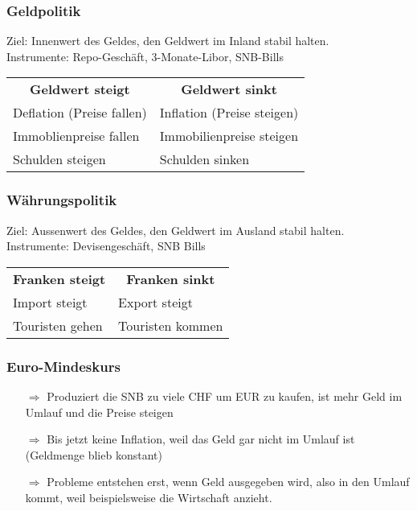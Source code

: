 \subsubsection{Geldpolitik}
Ziel: Innenwert des Geldes, den Geldwert im Inland stabil halten. \\
Instrumente: Repo-Geschäft, 3-Monate-Libor, SNB-Bills\\

\begin{center}
	\begin{tabular}{ll}
		\multicolumn{1}{c}{\textbf{Geldwert steigt}} & \multicolumn{1}{c}{\textbf{Geldwert sinkt}}\\
		Deflation (Preise fallen)	& Inflation (Preise steigen)\\
		Immoblienpreise fallen		& Immobilienpreise steigen\\
		Schulden steigen			& Schulden sinken\\
	\end{tabular}
\end{center}


\subsubsection{Währungspolitik}
Ziel: Aussenwert des Geldes, den Geldwert im Ausland stabil halten.\\
Instrumente: Devisengeschäft, SNB Bills\\

\begin{center}
	\begin{tabular}{ll}
		\multicolumn{1}{c}{\textbf{Franken steigt}} & \multicolumn{1}{c}{\textbf{Franken sinkt}}\\
		Import steigt				& Export steigt\\
		Touristen gehen				& Touristen kommen\\
	\end{tabular}
\end{center}

\subsubsection{Euro-Mindeskurs}
\begin{itemize}\itemsep0em
	\item[$\Rightarrow$] Produziert die SNB zu viele CHF um EUR zu kaufen, ist mehr Geld im Umlauf und die Preise steigen
	\item[$\Rightarrow$] Bis jetzt keine Inflation, weil das Geld gar nicht im Umlauf ist (Geldmenge blieb konstant)
	\item[$\Rightarrow$] Probleme entstehen erst, wenn Geld ausgegeben wird, also in den Umlauf kommt, weil beispielsweise die Wirtschaft anzieht.
\end{itemize}

